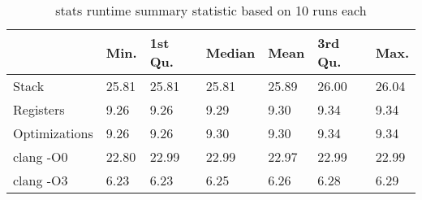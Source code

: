 \begin{table}[h!]
\centering
\begin{tabular}{p{}p{}p{}p{}p{}p{}p{}}
  \hline
 & Min. & 1st Qu. & Median & Mean & 3rd Qu. & Max. \\ 
  \hline
Stack & 25.81 & 25.81 & 25.81 & 25.89 & 26.00 & 26.04 \\ 
  Registers & 9.26 & 9.26 & 9.29 & 9.30 & 9.34 & 9.34 \\ 
  Optimizations & 9.26 & 9.26 & 9.30 & 9.30 & 9.34 & 9.34 \\ 
  clang -O0 & 22.80 & 22.99 & 22.99 & 22.97 & 22.99 & 22.99 \\ 
  clang -O3 & 6.23 & 6.23 & 6.25 & 6.26 & 6.28 & 6.29 \\ 
   \hline
\end{tabular}
\caption{stats runtime summary statistic based on 10 runs each}
\end{table}
